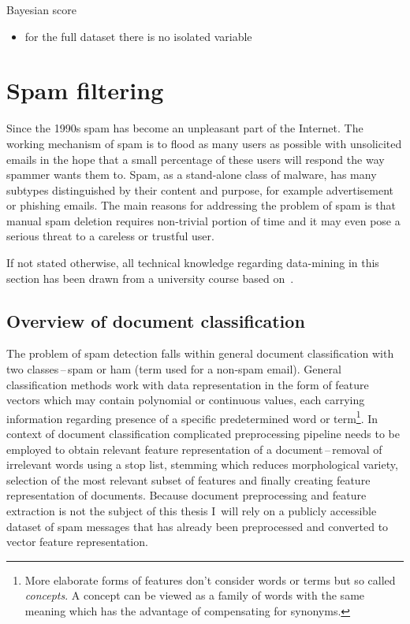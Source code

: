 \documentclass[english,cover]{fitthesis} %
\newcommand{\term}[1]{\emph{#1}}           %
\begin{document}
Bayesian score
\begin{itemize}
    \item for the full dataset there is no isolated variable
\end{itemize}


\section{Spam filtering}
Since the 1990s spam has become an unpleasant part of the Internet. The working mechanism of spam is to flood as many users as possible with unsolicited emails in the hope that a small percentage of these users will respond the way spammer wants them to. Spam, as a stand-alone class of malware, has many subtypes distinguished by their content and purpose, for example advertisement or phishing emails. The main reasons for addressing the problem of spam is that manual spam deletion requires non-trivial portion of time and it may even pose a serious threat to a careless or trustful user.

If not stated otherwise, all technical knowledge regarding data-mining in this section has been drawn from a university course based on~\cite{han_datamining}.

\subsection{Overview of document classification}
The problem of spam detection falls within general document classification with two classes\,--\,spam or ham (term used for a non-spam email). General classification methods work with data representation in the form of feature vectors which may contain polynomial or continuous values, each carrying information regarding presence of a specific predetermined word or term\footnote{More elaborate forms of features don't consider words or terms but so called \term{concepts}. A concept can be viewed as a family of words with the same meaning which has the advantage of compensating for synonyms.}. In context of document classification complicated preprocessing pipeline needs to be employed to obtain relevant feature representation of a document\,--\,removal of irrelevant words using a stop list, stemming which reduces morphological variety, selection of the most relevant subset of features and finally creating feature representation of documents. Because document preprocessing and feature extraction is not the subject of this thesis I~will rely on a publicly accessible dataset of spam messages that has already been preprocessed and converted to vector feature representation.
\end{document}

